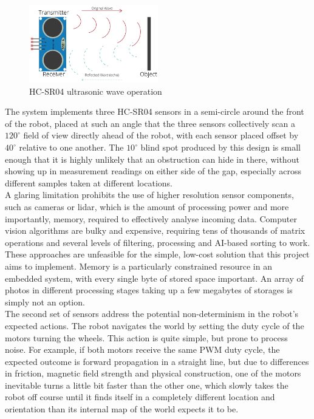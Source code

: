 \begin{figure}[H]
    \centering
    \includegraphics[width=0.5\textwidth]{figures/hcsr04_waves.png}
    \caption{HC-SR04 ultrasonic wave operation}
    \label{fig:hcsr04_waves}
\end{figure}

The system implements three HC-SR04 sensors in a semi-circle around the front of the robot, placed at such an angle that the three sensors collectively scan a $120^\circ$ field of view directly ahead of the robot, with each sensor placed offset by $40^\circ$ relative to one another. The $10^\circ$ blind spot produced by this design is small enough that it is highly unlikely that an obstruction can hide in there, without showing up in measurement readings on either side of the gap, especially across different samples taken at different locations. \\

A glaring limitation prohibits the use of higher resolution sensor components, such as cameras or lidar, which is the amount of processing power and more importantly, memory, required to effectively analyse incoming data. Computer vision algorithms are bulky and expensive, requiring tens of thousands of matrix operations and several levels of filtering, processing and AI-based sorting to work. These approaches are unfeasible for the simple, low-cost solution that this project aims to implement. Memory is a particularly constrained resource in an embedded system, with every single byte of stored space important. An array of photos in different processing stages taking up a few megabytes of storages is simply not an option. \\

The second set of sensors address the potential non-determinism in the robot's expected actions. The robot navigates the world by setting the duty cycle of the motors turning the wheels. This action is quite simple, but prone to process noise. For example, if both motors receive the same PWM duty cycle, the expected outcome is forward propagation in a straight line, but due to differences in friction, magnetic field strength and physical construction, one of the motors inevitable turns a little bit faster than the other one, which slowly takes the robot off course until it finds itself in a completely different location and orientation than its internal map of the world expects it to be. \\

